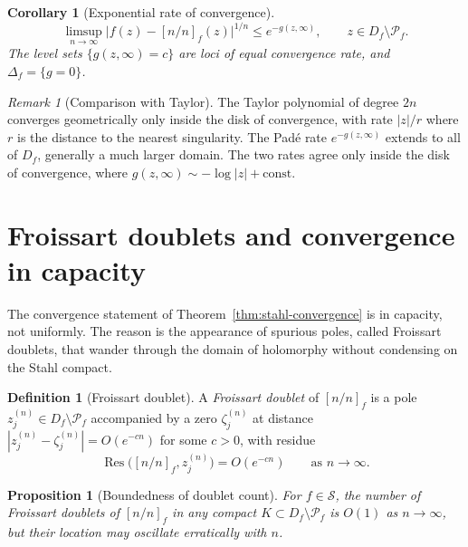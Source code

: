 \documentclass[11pt]{article}
\newtheorem{proposition}[theorem]{Proposition}
\newtheorem{corollary}[theorem]{Corollary}
\theoremstyle{definition}
\newtheorem{definition}[theorem]{Definition}
\theoremstyle{remark}
\newtheorem{remark}[theorem]{Remark}
\DeclareMathOperator{\Res}{Res}
\begin{document}
\begin{corollary}[Exponential rate of convergence]
\label{cor:exponential-rate}
\begin{equation}
\limsup_{n\to\infty}\bigl|f(z)-[n/n]_{f}(z)\bigr|^{1/n}\le e^{-g(z,\infty)},
\qquad z\in D_{f}\setminus\mathcal{P}_{f}.
\label{eq:rate}
\end{equation}
The level sets $\{g(z,\infty)=c\}$ are loci of equal convergence rate, and $\Delta_{f}=\{g=0\}$.
\end{corollary}

\begin{remark}[Comparison with Taylor]
\label{rem:taylor-comparison}
The Taylor polynomial of degree $2n$ converges geometrically only inside the disk of convergence, with rate $|z|/r$ where $r$ is the distance to the nearest singularity. The Pad\'e rate $e^{-g(z,\infty)}$ extends to all of $D_{f}$, generally a much larger domain. The two rates agree only inside the disk of convergence, where $g(z,\infty)\sim-\log|z|+\mathrm{const}$.
\end{remark}

\section{Froissart doublets and convergence in capacity}
\label{sec:froissart}

The convergence statement of Theorem~\ref{thm:stahl-convergence} is in capacity, not uniformly. The reason is the appearance of spurious poles, called Froissart doublets, that wander through the domain of holomorphy without condensing on the Stahl compact.

\begin{definition}[Froissart doublet]
\label{def:froissart}
A \emph{Froissart doublet} of $[n/n]_{f}$ is a pole $z_{j}^{(n)}\in D_{f}\setminus\mathcal{P}_{f}$ accompanied by a zero $\zeta_{j}^{(n)}$ at distance $|z_{j}^{(n)}-\zeta_{j}^{(n)}|=O(e^{-cn})$ for some $c>0$, with residue
\begin{equation}
\Res\bigl([n/n]_{f},z_{j}^{(n)}\bigr)=O(e^{-cn})
\qquad\text{as }n\to\infty.
\label{eq:doublet-residue}
\end{equation}
\end{definition}

\begin{proposition}[Boundedness of doublet count]
\label{prop:doublet-count}
For $f\in\mathcal{S}$, the number of Froissart doublets of $[n/n]_{f}$ in any compact $K\subset D_{f}\setminus\mathcal{P}_{f}$ is $O(1)$ as $n\to\infty$, but their location may oscillate erratically with $n$.
\end{proposition}
\end{document}
